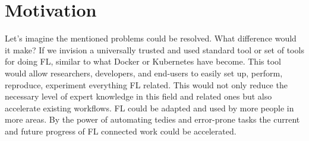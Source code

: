 \section{Motivation}

Let's imagine the mentioned problems could be resolved. What difference would it make?
If we invision a universally trusted and used standard tool or set of tools for doing FL,
similar to what Docker or Kubernetes have become. 
This tool would allow researchers, developers, and end-users to easily
set up, perform, reproduce, experiment everything FL related.
This would not only reduce the necessary level of expert knowledge in this field and related ones
but also accelerate existing workflows.
FL could be adapted and used by more people in more areas.
By the power of automating tedies and error-prone tasks the current and future progress of FL connected work could be accelerated.